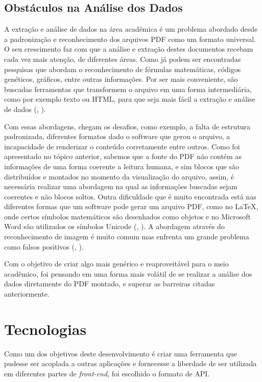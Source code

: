 \subsection{Obstáculos na Análise dos Dados}

A extração e análise de dados na área acadêmica é um problema abordado desde a padronização e reconhecimento dos arquivos PDF como um formato universal. O seu crescimento faz com que a análise e extração destes documentos recebam cada vez mais atenção, de diferentes áreas. Como já podem ser encontradas pesquisas que abordam o reconhecimento de fórmulas matemáticas, códigos genéticos, gráficos, entre outras informações. Por ser mais conveniente, são buscadas ferramentas que transformem o arquivo em uma forma intermediária, como por exemplo texto ou HTML, para que seja mais fácil a extração e análise de dados (\citeauthor{ajedig2011pdf}, \citeyear{ajedig2011pdf}).

Com essas abordagens, chegam os desafios, como exemplo, a falta de estrutura padronizada, diferentes formatos dado o software que gerou o arquivo, a incapacidade de renderizar o conteúdo corretamente entre outros. Como foi apresentado no tópico anterior, sabemos que a fonte do PDF não contém as informações de uma forma coerente a leitura humana, e sim blocos que são distribuídos e montados no momento da visualização do arquivo, assim, é necessária realizar uma abordagem na qual as informações buscadas sejam coerentes e não blocos soltos. Outra dificuldade que é muito encontrada está nas diferentes formas que um software pode gerar um arquivo PDF, como no LaTeX, onde certos símbolos matemáticos são desenhados como objetos e no Microsoft Word são utilizados os símbolos Unicode (\citeauthor{sasirekhatext}, \citeyear{sasirekhatext}). A abordagem através do reconhecimento de imagem é muito comum mas enfrenta um grande problema como falsos positivos (\citeauthor{ajedig2011pdf}, \citeyear{ajedig2011pdf}).

Com o objetivo de criar algo mais genérico e reaproveitável para o meio acadêmico, foi pensando em uma forma mais volátil de se realizar a análise dos dados diretamente do PDF montado, e superar as barreiras citadas anteriormente.

\section{Tecnologias}
Como um dos objetivos deste desenvolvimento é criar uma ferramenta que pudesse ser acoplada a outras aplicações e fornecesse a liberdade de ser utilizada em diferentes partes de \textit{front-end}, foi escolhido o formato de API. 

